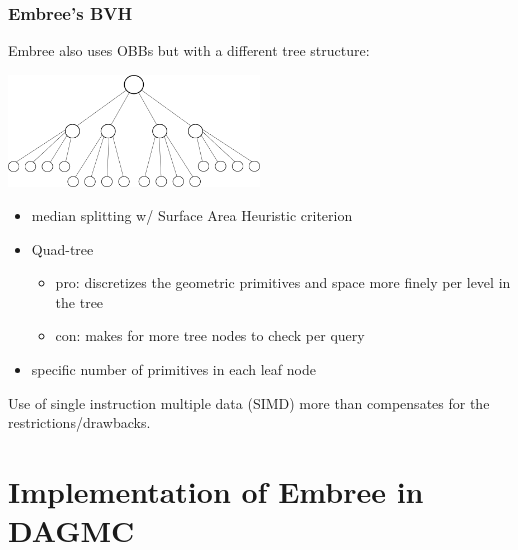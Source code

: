 \documentclass[12pt]{beamer}
\begin{document}
\begin{frame}

\frametitle{Embree's BVH}

Embree also uses OBBs but with a different tree structure:

\begin{center}
\includegraphics[width=0.5\textwidth]{quad_tree.png}
\end{center}

\begin{itemize}
\item median splitting w/ Surface Area Heuristic \cite{sah} criterion 
\item Quad-tree
  \begin{itemize}
  \item pro: discretizes the geometric primitives and space more finely per level in the tree
  \item con: makes for more tree nodes to check per query
  \end{itemize}
\item specific number of primitives in each leaf node
\end{itemize}
Use of single instruction multiple data (SIMD) more than compensates for the restrictions/drawbacks.
\end{frame}


\section{Implementation of Embree in DAGMC} %
\end{document}
